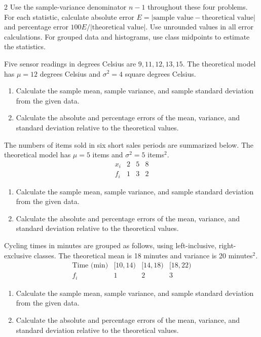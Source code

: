 \begin{multicols}{2}
Use the sample-variance denominator $n-1$ throughout these four problems.
For each statistic, calculate absolute error $E=|\text{sample value}-\text{theoretical value}|$
and percentage error $100E/|\text{theoretical value}|$. Use unrounded values in all error calculations.
For grouped data and histograms, use class midpoints to estimate the statistics.

Five sensor readings in degrees Celsius are $9,11,12,13,15$.
The theoretical model has $\mu=12$ degrees Celsius and
$\sigma^2=4$ square degrees Celsius.
\begin{enumerate}[label=\textbf{(\alph*)}]
\item Calculate the sample mean, sample variance, and sample standard deviation from the given data. 
\item Calculate the absolute and percentage errors of the mean, variance, and standard deviation relative to the theoretical values. 
\end{enumerate}

The numbers of items sold in six short sales periods are summarized below.
The theoretical model has $\mu=5$ items and $\sigma^2=5$ items$^2$.
\[
\begin{array}{c|rrr}x_i&2&5&8\\\hline f_i&1&3&2\end{array}
\]
\begin{enumerate}[label=\textbf{(\alph*)}]
\item Calculate the sample mean, sample variance, and sample standard deviation from the given data. 
\item Calculate the absolute and percentage errors of the mean, variance, and standard deviation relative to the theoretical values. 
\end{enumerate}

Cycling times in minutes are grouped as follows, using left-inclusive,
right-exclusive classes. The theoretical mean is 18 minutes and variance
is 20 minutes$^2$.
\[
\begin{array}{c|rrr}
\text{Time (min)}&[10,14)&[14,18)&[18,22)\\\hline
f_i&1&2&3
\end{array}
\]
\begin{enumerate}[label=\textbf{(\alph*)}]
\item Calculate the sample mean, sample variance, and sample standard deviation from the given data. 
\item Calculate the absolute and percentage errors of the mean, variance, and standard deviation relative to the theoretical values. 
\end{enumerate}


\end{multicols}
